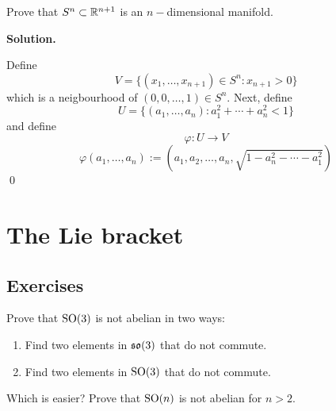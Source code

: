 \documentclass[12pt]{book}
\theoremstyle{definition}
\newenvironment{solution}
{%
  \par\noindent\textbf{Solution.}\quad
}
{%
  \qed\par
}
\begin{document}
\begin{taggedexercise}[\textcolor{yellow}{WIP}]
  Prove that $S^n \subset \mathbb{R}^{n+1}$ is an $n-$dimensional manifold.
\end{taggedexercise}
\begin{solution}
  Define 
  \[V = \{(x_1, \dots, x_{n+1}) \in S^n : x_{n+1} >0\}\]
  which is a neigbourhood of $(0, 0, \dots, 1) \in S^n$.
  Next, define
  \[U = \{(a_1, \dots, a_n) : a_1^2 + \cdots + a_n^2 < 1\}\]
  and define
  \[\varphi : U \to V\]
  \[\varphi(a_1, \dots, a_n) := (a_1, a_2, \dots , a_n, \sqrt{1 - a_n^2 - \cdots - a_1^2})\]
\end{solution}

\chapter{The Lie bracket}
\section{Exercises}

\begin{taggedexercise}[\textcolor{green}{Complete}]
Prove that $\mathrm{SO}(3)$ is not abelian in two ways:
\begin{enumerate}
  \item Find two elements in $\mathfrak{so}(3)$ that do not commute.
  \item Find two elements in $\mathrm{SO}(3)$ that do not commute.
\end{enumerate}
Which is easier? 
Prove that $\mathrm{SO}(n)$ is not abelian for $n > 2$.
\end{taggedexercise}
\end{document}
